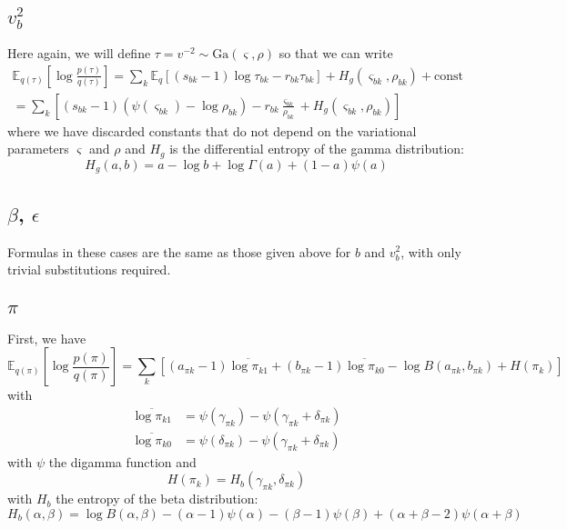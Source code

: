 \documentclass[11pt]{article}
\begin{document}
\subsection{$v^2_b$}
Here again, we will define $\tau = v^{-2} \sim \mathrm{Ga}(\varsigma, \rho)$ so that we can write
\begin{multline}
    \mathbb{E}_{q(\tau)}\left[\log \frac{p(\tau)}{q(\tau)}\right] =
    \sum_k \mathbb{E}_q \left[
    (s_{bk} - 1) \log \tau_{bk} - r_{bk} \tau_{bk} \right]  
    + H_g(\varsigma_{bk}, \rho_{bk})    
    + \mathrm{const} \\
    = \sum_k \left[ 
    (s_{bk} - 1) (\psi(\varsigma_{bk}) - \log \rho_{bk}) 
    - r_{bk} \frac{\varsigma_{bk}}{\rho_{bk}} + H_g(\varsigma_{bk}, \rho_{bk})
    \right]
\end{multline}
where we have discarded constants that do not depend on the variational parameters $\varsigma$ and $\rho$ and $H_g$ is the differential entropy of the gamma distribution:
\begin{equation}
    H_g(a, b) = a - \log b + \log \Gamma(a) + (1 - a)\psi(a)
\end{equation}

\subsection{$\beta$, $\epsilon$}
Formulas in these cases are the same as those given above for $b$ and $v^2_b$, with only trivial substitutions required.

\subsection{$\pi$}
First, we have
\begin{equation}
    \mathbb{E}_{q(\pi)} \left[\log \frac{p(\pi)}{q(\pi)} \right] = \sum_k \left[(a_{\pi k} - 1)\overline{\log \pi_{k1}} + (b_{\pi k} - 1) \overline{\log \pi_{k0}} - \log B(a_{\pi k}, b_{\pi k}) + H(\pi_k) \right]
\end{equation}
with
\begin{align}
    \overline{\log \pi_{k1}} &= \psi(\gamma_{\pi k}) - \psi(\gamma_{\pi k} + \delta_{\pi k}) \\
    \overline{\log \pi_{k0}} &= \psi(\delta_{\pi k}) - \psi(\gamma_{\pi k} + \delta_{\pi k})
\end{align}
with $\psi$ the digamma function and 
\begin{equation}
    H(\pi_k) = H_b(\gamma_{\pi k}, \delta_{\pi k})
\end{equation}
with $H_b$ the entropy of the beta distribution:
\begin{equation}
    H_b(\alpha, \beta) = \log B(\alpha, \beta) - (\alpha - 1) \psi(\alpha) - (\beta - 1) \psi(\beta) + (\alpha + \beta - 2)\psi(\alpha + \beta)
\end{equation}
\end{document}
